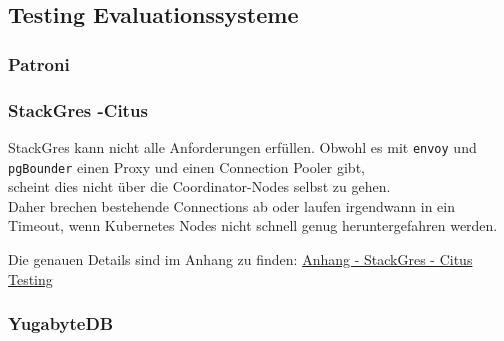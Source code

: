 
\begin{flushleft}
    \subsection{Testing Evaluationssysteme}
    \subsubsection{Patroni}
    
\end{flushleft}
\begin{flushleft}
    \subsubsection{StackGres -Citus}
    StackGres kann nicht alle Anforderungen erfüllen.
    Obwohl es mit \texttt{envoy} und \texttt{pgBounder} einen Proxy und einen Connection Pooler gibt,\\
    scheint dies nicht über die Coordinator-Nodes selbst zu gehen.\\
    Daher brechen bestehende Connections ab oder laufen irgendwann in ein Timeout, wenn \Gls{Kubernetes} Nodes nicht schnell genug heruntergefahren werden.
    
    Die genauen Details sind im Anhang zu finden:
    \hyperref[subsec:appendix_testing_stackgres_citus]{Anhang - StackGres - Citus Testing}
\end{flushleft}
\begin{flushleft}
    \subsubsection{YugabyteDB}
    
\end{flushleft}